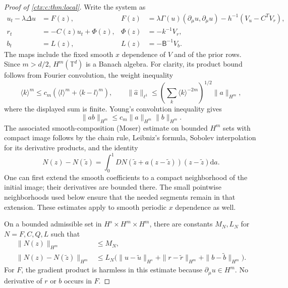 \begin{proof}[Proof of \cref{ctx:c:thm:local}]
Write the system as
\begin{align}
 u_t-\lambda\Delta u&=F(z),&
 F(z)&=\lambda\Gamma(u)(\partial_\mu u,\partial_\mu u)
                  -h^{-1}(V_u-C^TV_r),\label{ctx:c:eq:F}\\
 r_t&=-C(z)u_t+\Phi(z),& \Phi(z)&=-k^{-1}V_r,\\
 b_t&=L(z),& L(z)&=-\mathsf B^{-1}V_b.
\end{align}
The maps include the fixed smooth $x$ dependence of $V$ and of the prior rows. Since $m>d/2$, $H^m(\mathbb T^d)$ is a Banach algebra. For clarity, its product bound follows from Fourier convolution, the weight inequality
\begin{equation}
 \langle k\rangle^m\leq c_m(\langle l\rangle^m+
                               \langle k-l\rangle^m),
 \qquad
 \|\widehat a\|_{\ell^1}\leq
 \left(\sum_k\langle k\rangle^{-2m}\right)^{1/2}\|a\|_{H^m},
\end{equation}
where the displayed sum is finite. Young's convolution inequality gives
\begin{equation}
 \|ab\|_{H^m}\leq c_m\|a\|_{H^m}\|b\|_{H^m}.
\end{equation}
The associated smooth-composition (Moser) estimate on bounded $H^m$ sets with compact image \cite[Chapter~13]{Taylor2011} follows by the chain rule, Leibniz's formula, Sobolev interpolation for its derivative products, and the identity
\begin{equation}
 N(z)-N(\widetilde z)
 =\int_0^1DN(\widetilde z+a(z-\widetilde z))(z-\widetilde z)\mathrm d a.
\end{equation}
One can first extend the smooth coefficients to a compact neighborhood of the initial image; their derivatives are bounded there. The small pointwise neighborhoods used below ensure that the needed segments remain in that extension. These estimates apply to smooth periodic $x$ dependence as well.

On a bounded admissible set in $H^s\times H^m\times H^m$, there are constants $M_N,L_N$ for $N=F,C,Q,L$ such that
\begin{align}
 \|N(z)\|_{H^m}&\leq M_N,\\
 \|N(z)-N(\widetilde z)\|_{H^m}
 &\leq L_N\bigl(\|u-\widetilde u\|_{H^s}
              +\|r-\widetilde r\|_{H^m}
              +\|b-\widetilde b\|_{H^m}\bigr).
 \label{ctx:c:eq:nonlinearestimates}
\end{align}
For $F$, the gradient product is harmless in this estimate because $\partial_\mu u\in H^m$. No derivative of $r$ or $b$ occurs in $F$.


\end{proof}
